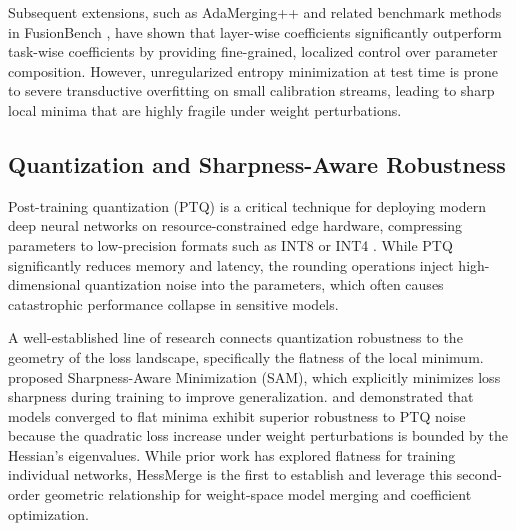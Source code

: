 Subsequent extensions, such as AdaMerging++ and related benchmark methods in FusionBench \cite{fusionbench}, have shown that layer-wise coefficients significantly outperform task-wise coefficients by providing fine-grained, localized control over parameter composition. However, unregularized entropy minimization at test time is prone to severe transductive overfitting on small calibration streams, leading to sharp local minima that are highly fragile under weight perturbations.

\subsection{Quantization and Sharpness-Aware Robustness}
Post-training quantization (PTQ) is a critical technique for deploying modern deep neural networks on resource-constrained edge hardware, compressing parameters to low-precision formats such as INT8 or INT4 \cite{gholami2022survey}. While PTQ significantly reduces memory and latency, the rounding operations inject high-dimensional quantization noise into the parameters, which often causes catastrophic performance collapse in sensitive models.

A well-established line of research connects quantization robustness to the geometry of the loss landscape, specifically the flatness of the local minimum. \citet{sam} proposed Sharpness-Aware Minimization (SAM), which explicitly minimizes loss sharpness during training to improve generalization. \citet{asymmetric_flatness} and \citet{quantization_flatness} demonstrated that models converged to flat minima exhibit superior robustness to PTQ noise because the quadratic loss increase under weight perturbations is bounded by the Hessian's eigenvalues. While prior work has explored flatness for training individual networks, HessMerge is the first to establish and leverage this second-order geometric relationship for weight-space model merging and coefficient optimization.
